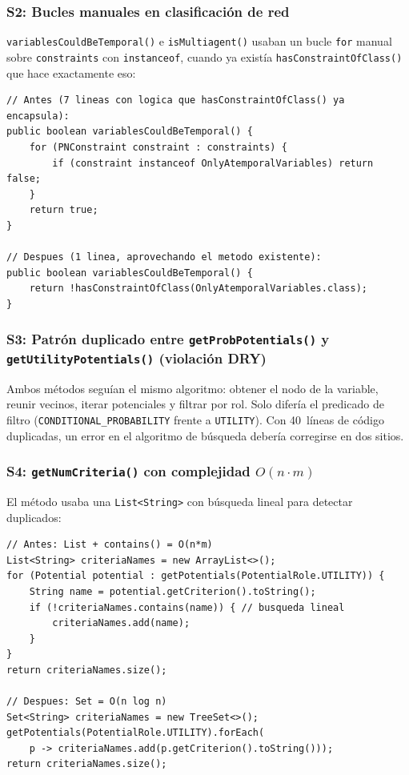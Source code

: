 \documentclass[11pt,a4paper]{article}
\newcommand{\code}[1]{\texttt{#1}}
\begin{document}
\subsubsection{S2: Bucles manuales en clasificación de red}

\code{variablesCouldBeTemporal()} e \code{isMultiagent()} usaban un
bucle \code{for} manual sobre \code{constraints} con \code{instanceof},
cuando ya existía \code{hasConstraintOfClass()} que hace exactamente eso:

\begin{lstlisting}[caption={S2: bucle manual donde existe un método más expresivo.},
                   label=lst:s2]
// Antes (7 lineas con logica que hasConstraintOfClass() ya encapsula):
public boolean variablesCouldBeTemporal() {
    for (PNConstraint constraint : constraints) {
        if (constraint instanceof OnlyAtemporalVariables) return false;
    }
    return true;
}

// Despues (1 linea, aprovechando el metodo existente):
public boolean variablesCouldBeTemporal() {
    return !hasConstraintOfClass(OnlyAtemporalVariables.class);
}
\end{lstlisting}

\subsubsection{S3: Patrón duplicado entre \texttt{getProbPotentials()} y
                   \texttt{getUtilityPotentials()} (violación DRY)}

Ambos métodos seguían el mismo algoritmo: obtener el nodo de la variable,
reunir vecinos, iterar potenciales y filtrar por rol.  Solo difería el
predicado de filtro (\code{CONDITIONAL\_PROBABILITY} frente a
\code{UTILITY}).  Con 40~líneas de código duplicadas, un error en el
algoritmo de búsqueda debería corregirse en dos sitios.

\subsubsection{S4: \texttt{getNumCriteria()} con complejidad
                   \texorpdfstring{$O(n \cdot m)$}{O(n*m)}}

El método usaba una \code{List<String>} con búsqueda lineal para detectar
duplicados:

\begin{lstlisting}[caption={S4: complejidad cuadrática innecesaria con \texttt{List}.},
                   label=lst:s4]
// Antes: List + contains() = O(n*m)
List<String> criteriaNames = new ArrayList<>();
for (Potential potential : getPotentials(PotentialRole.UTILITY)) {
    String name = potential.getCriterion().toString();
    if (!criteriaNames.contains(name)) { // busqueda lineal
        criteriaNames.add(name);
    }
}
return criteriaNames.size();

// Despues: Set = O(n log n)
Set<String> criteriaNames = new TreeSet<>();
getPotentials(PotentialRole.UTILITY).forEach(
    p -> criteriaNames.add(p.getCriterion().toString()));
return criteriaNames.size();
\end{lstlisting}
\end{document}

